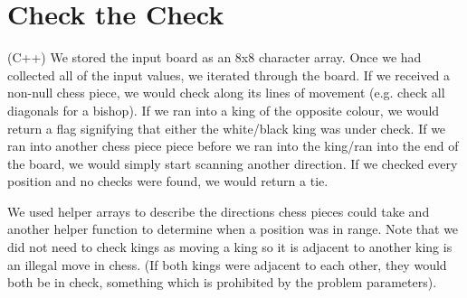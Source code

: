 \documentclass{article}
\begin{document}
\section{Check the Check}
(C++) We stored the input board as an 8x8 character array. Once we had collected all of the input values, we iterated through the board.
If we received a non-null chess piece, we would check along its lines of movement (e.g. check all diagonals for a bishop). 
If we ran into a king of the opposite colour, we would return a flag signifying that either the white/black king was under check. 
If we ran into another chess piece piece before we ran into the king/ran into the end of the board, we would simply start scanning another direction. 
If we checked every position and no checks were found, we would return a tie.
\par
We used helper arrays to describe the directions chess pieces could take and another helper function to determine when a position was in range.
Note that we did not need to check kings as moving a king so it is adjacent to another king is an illegal move in chess. (If both kings were adjacent to each other, they would both be in check, something which is prohibited by the problem parameters).
\end{document}

